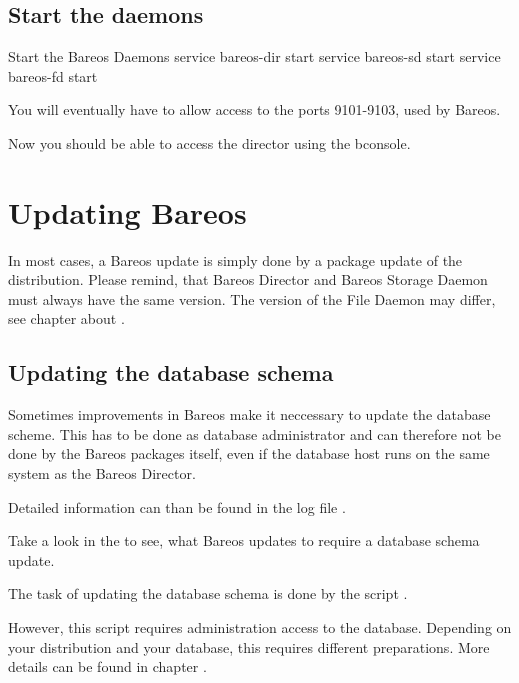 \section{Start the daemons}
\begin{commands}{Start the Bareos Daemons}
service bareos-dir start
service bareos-sd start
service bareos-fd start
\end{commands}

You will eventually have to allow access to the ports 9101-9103, used by Bareos.

Now you should be able to access the director using the bconsole.

\chapter{Updating Bareos}
\label{bareos-update}

In most cases, a Bareos update is simply done by a package update of the distribution.
Please remind, that Bareos Director and Bareos Storage Daemon must always have the same version.
The version of the File Daemon may differ, see chapter about .

\section{Updating the database schema}

Sometimes improvements in Bareos make it neccessary to update the database scheme.
This has to be done as database administrator and can therefore not be done by the Bareos packages itself, even if the database host runs on the same system as the Bareos Director.

Detailed information can than be found in the log file \logfileUnix.

Take a look in the  to see, what Bareos updates to require a database schema update.

The task of updating the database schema is done by the script
.

However, this script requires administration access to the database.
Depending on your distribution and your database, this requires different preparations.
More details can be found in chapter .


